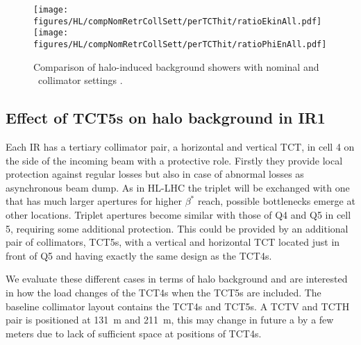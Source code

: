 
\begin{figure}
\begin{center}
\texttt{[image: figures/HL/compNomRetrCollSett/perTCThit/ratioEkinAll.pdf]}
\texttt{[image: figures/HL/compNomRetrCollSett/perTCThit/ratioPhiEnAll.pdf]}
\end{center}
\vspace{-0.6cm}
 \caption{Comparison of halo-induced background showers with nominal and \twosigmaret~collimator settings .
  \label{fig:compNomRetrSett}}
\end{figure}



\subsection{Effect of TCT5s on halo background in IR1}

Each IR has a tertiary collimator pair, a horizontal and vertical TCT, in cell 4 on the side of the incoming beam with a protective role. Firstly they provide local protection against regular losses but also in case of abnormal losses as asynchronous beam dump. As in HL-LHC the triplet will be exchanged with one that has much larger apertures for higher $\beta^*$ reach, possible bottlenecks emerge at other locations. Triplet apertures become similar with those of Q4 and Q5 in cell 5, requiring some additional protection. This could be provided by an additional pair of collimators, TCT5s, with a vertical and horizontal TCT located just in front of Q5 and having exactly the same design as the TCT4s.

We evaluate these different cases in terms of halo background and are interested in how the load changes of the TCT4s when the TCT5s are included. The baseline collimator layout contains the TCT4s and TCT5s. A TCTV and TCTH pair is positioned at 131~m and 211~m, this may change in future a by a few meters due to lack of sufficient space at positions of TCT4s.

